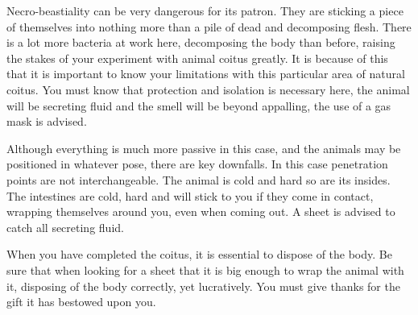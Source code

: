            Necro-beastiality can be very dangerous for its patron. They are 
sticking a piece of themselves into nothing more than a pile of dead and 
decomposing flesh. There is a lot more bacteria at work here, decomposing the 
body than before, raising the stakes of your experiment with animal coitus 
greatly. It is because of this that it is important to know your limitations 
with this particular area of natural coitus. You must know that protection and 
isolation is necessary here, the animal will be secreting fluid and the smell 
will be beyond appalling, the use of a gas mask is advised.

    Although everything is much more passive in this case, and the animals may 
be positioned in whatever  pose, there are key downfalls. In this case 
penetration points are not interchangeable. The animal is cold and hard so are 
its insides. The intestines are cold, hard and will stick to you if they come in 
contact, wrapping themselves around you, even when coming out. A sheet is 
advised to catch all secreting fluid.

   

    When you have completed the coitus, it is essential to dispose of the body. 
Be sure that when looking for a sheet that it is big enough to wrap the animal 
with it, disposing of the body correctly, yet lucratively. You must give thanks 
for the gift it has bestowed upon you. 